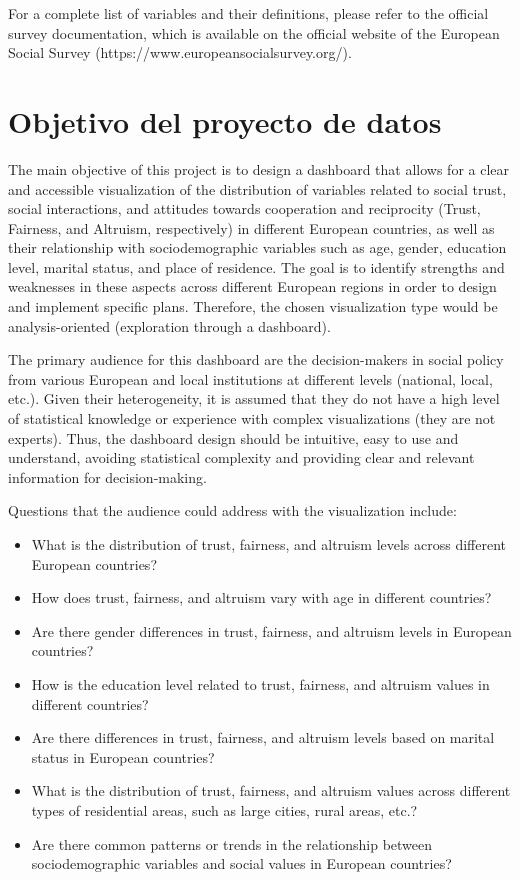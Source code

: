 \documentclass{article}
\begin{document}
For a complete list of variables and their definitions, please refer to the official survey documentation, which is available on the official website of the European Social Survey (https://www.europeansocialsurvey.org/).

\section{Objetivo del proyecto de datos}

The main objective of this project is to design a dashboard that allows for a clear and accessible visualization of the distribution of variables related to social trust, social interactions, and attitudes towards cooperation and reciprocity (Trust, Fairness, and Altruism, respectively) in different European countries, as well as their relationship with sociodemographic variables such as age, gender, education level, marital status, and place of residence. The goal is to identify strengths and weaknesses in these aspects across different European regions in order to design and implement specific plans. Therefore, the chosen visualization type would be analysis-oriented (exploration through a dashboard).

The primary audience for this dashboard are the decision-makers in social policy from various European and local institutions at different levels (national, local, etc.). Given their heterogeneity, it is assumed that they do not have a high level of statistical knowledge or experience with complex visualizations (they are not experts). Thus, the dashboard design should be intuitive, easy to use and understand, avoiding statistical complexity and providing clear and relevant information for decision-making.

Questions that the audience could address with the visualization include:

\begin{itemize}
  \item What is the distribution of trust, fairness, and altruism levels across different European countries?
  \item How does trust, fairness, and altruism vary with age in different countries?
  \item Are there gender differences in trust, fairness, and altruism levels in European countries?
  \item How is the education level related to trust, fairness, and altruism values in different countries?
  \item Are there differences in trust, fairness, and altruism levels based on marital status in European countries?
  \item What is the distribution of trust, fairness, and altruism values across different types of residential areas, such as large cities, rural areas, etc.?
  \item Are there common patterns or trends in the relationship between sociodemographic variables and social values in European countries?
\end{itemize}
\end{document}

